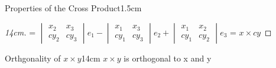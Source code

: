 \begin{ltheorem}{Properties of the Cross Product}{1.5cm}
\begin{proof}[14cm]
                \hspace{1.5cm}
                = $\begin{vmatrix}
                    x_2 & x_3 \\
                    cy_2 & cy_3 
                \end{vmatrix}e_1
                - \begin{vmatrix}
                    x_1 & x_3 \\
                    cy_1 & cy_3 
                \end{vmatrix}e_2
                + \begin{vmatrix}
                    x_1 & x_2 \\
                    cy_1 & cy_2 
                \end{vmatrix}e_3$
                = $x \times cy$
            \end{proof}
    \end{ltheorem}

    \vspace{0.5cm}



    \begin{wtheorem}{Orthgonality of $x \times y$}{14cm}
        $x \times y$ is orthogonal to x and y
    \end{wtheorem}

